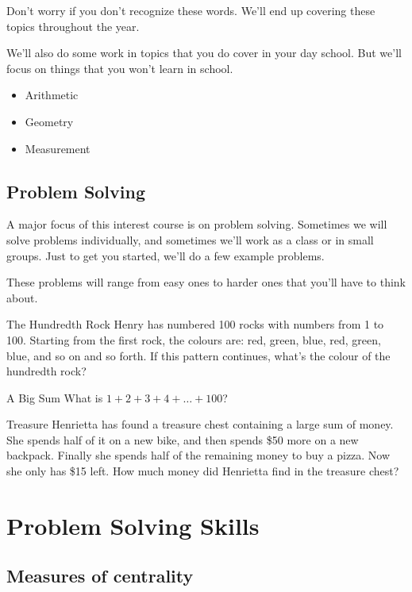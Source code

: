 \documentclass[a4paper,10pt]{report}
\begin{document}
Don't worry if you don't recognize these words. We'll end up covering these
topics throughout the year.

We'll also do some work in topics that you do cover in your day school. But
we'll focus on things that you won't learn in school.

\begin{itemize}
 \item Arithmetic
 \item Geometry
 \item Measurement
\end{itemize}

\section{Problem Solving}
A major focus of this interest course is on problem solving. Sometimes we will
solve problems individually, and sometimes we'll work as a class or in small
groups. Just to get you started, we'll do a few example problems.

These problems will range from easy ones to harder ones that you'll have to
think about.

\begin{problem}{The Hundredth Rock}
 Henry has numbered 100 rocks with numbers from 1 to 100. Starting from the
 first rock, the colours are: red, green, blue, red, green, blue, and so on and
 so forth. If this pattern continues, what's the colour of the hundredth rock?
\end{problem}

\begin{problem}{A Big Sum}
 What is $1+2+3+4+\ldots+100$?
\end{problem}

\begin{problem}{Treasure}
 Henrietta has found a treasure chest containing a large sum of money. She
 spends half of it on a new bike, and then spends \$50 more on a new backpack.
 Finally she spends half of the remaining money to buy a pizza. Now she only has
 \$15 left. How much money did Henrietta find in the treasure chest?
\end{problem}

\chapter{Problem Solving Skills}

\section{Measures of centrality}
\end{document}
